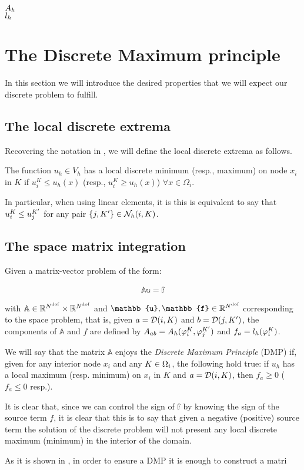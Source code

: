 $A_h$\\
$l_h$

\section{The Discrete Maximum principle}

In this section we will introduce the desired properties that we will expect our discrete problem to fulfill.

\subsection{The local discrete extrema}

Recovering the notation in \cite{badia_discrete_2015}, we will define the local discrete extrema as follows.

 \begin{definition}
 	The function $u_h\in V_h$ has a local discrete minimum (resp., maximum)  on node $x_i$ in $K$ if $u_i^K \leq u_h(x)$ (resp., $u_i^K \geq u_h(x)$) $\forall x\in \Omega_i$.
 \end{definition}
 
 In particular, when using linear elements, it is this is equivalent to say that $u_i^K\leq u_j^{K'}$ for any pair $\{j,{K'}\}\in \mathcal{N}_h(i,K) $.

\subsection{The space matrix integration}

Given a matrix-vector problem of the form:

\begin{align*}
 \mathbb{Au} = \mathbb{f}
\end{align*}

with $ \mathbb{A}\in \mathbb{R}^{N^{\rm dof}}\times\mathbb{R}^{N^{\rm dof}}$ and $ \mathbb{u}, \mathbb{f}\in\mathbb{R}^\ndofs$ corresponding to the space problem, that is, given $a=\mathcal{D}(i,K)$ and $b=\mathcal{D}(j,{K'})$, the components of $ \mathbb{A}$ and $f$ are defined by $A_{ab}=A_h(\varphi_{i}^{K},\varphi_{j}^{{K'}})$ and $f_a=l_h(\varphi_{i}^{K})$. 

\begin{definition}
	We will say that the matrix $ \mathbb{A}$ enjoys the \textit{Discrete Maximum Principle} (DMP) if, given for any interior node $x_i$ and any $K\in\Omega_i$, the following hold true: if $u_h$ has a local maximum (resp. minimum) on $x_i$ in $K$ and $a=\mathcal{D}(i,K)$, then $f_a \geq 0$ ($f_a\leq0$ resp.).
\end{definition}

It is clear that, since we can control the sign of $ \mathbb{f}$ by knowing the sign of the source term $f$, it is clear that this is to say that given a negative (positive) source term the solution of the discrete problem will not present any local discrete maximum (minimum) in the interior of the domain.


As it is shown in \cite{Jesus}, in order to ensure a DMP it is enough to construct a matri



